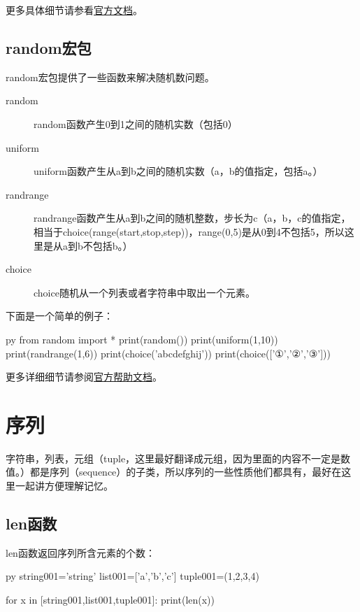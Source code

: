 \documentclass[12pt,oneside]{book}
\begin{document}
\begin{common-format}
更多具体细节请参看\href{http://docs.python.org/3.4/library/math.html}{官方文档}。




\subsection{random宏包}
random宏包提供了一些函数来解决随机数问题。%
\begin{description}
\item[random] random函数产生0到1之间的随机实数（包括0）
\item[uniform] uniform函数产生从a到b之间的随机实数（a，b的值指定，包括a。）
\item[randrange] randrange函数产生从a到b之间的随机整数，步长为c（a，b，c的值指定，相当于choice(range(start,stop,step))，range(0,5)是从0到4不包括5，所以这里是从a到b不包括b。）
\item[choice] choice随机从一个列表或者字符串中取出一个元素。
\end{description}

下面是一个简单的例子：
\begin{xverbatim}[129]{py}
from random import *
print(random())
print(uniform(1,10))
print(randrange(1,6))
print(choice('abcdefghij'))
print(choice(['①','②','③']))
\end{xverbatim}

更多详细细节请参阅\href{http://docs.python.org/3.4/library/random.html}{官方帮助文档}。











\section{序列}
字符串，列表，元组（tuple，这里最好翻译成元组，因为里面的内容不一定是数值。）都是序列（sequence）的子类，所以序列的一些性质他们都具有，最好在这里一起讲方便理解记忆。

\subsection{len函数}
len函数返回序列所含元素的个数：
\begin{xverbatim}[129]{py}
string001='string'
list001=['a','b','c']
tuple001=(1,2,3,4)

for x in [string001,list001,tuple001]:
    print(len(x))
\end{xverbatim}



\end{common-format}
\end{document}
